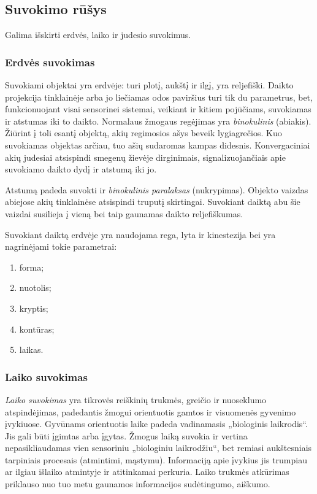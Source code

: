 \subsection{Suvokimo rūšys}

Galima išskirti erdvės, laiko ir judesio suvokimus.

\subsubsection{Erdvės suvokimas}

Suvokiami objektai yra erdvėje: turi plotį, aukštį ir ilgį, yra reljefiški.
Daikto projekcija tinklainėje arba jo liečiamas odos paviršius turi tik du 
parametrus, bet, funkcionuojant visai sensorinei sistemai, veikiant ir 
kitiem pojūčiams, suvokiamas ir atstumas iki to daikto. Normalaus žmogaus 
regėjimas yra \emph{binokulinis} (abiakis). Žiūrint į toli esantį objektą,
akių regimosios ašys beveik lygiagrečios. Kuo suvokiamas objektas arčiau, 
tuo ašių sudaromas kampas didesnis. Konvergaciniai akių judesiai atsispindi 
smegenų žievėje dirginimais, signalizuojančiais apie suvokiamo daikto dydį
ir atstumą iki jo.

Atstumą padeda suvokti ir \emph{binokulinis paralaksas} (nukrypimas). 
Objekto vaizdas abiejose akių tinklainėse atsispindi truputį skirtingai. 
Suvokiant daiktą abu šie vaizdai susilieja į vieną bei taip gaunamas
daikto reljefiškumas.

Suvokiant daiktą erdvėje yra naudojama rega, lyta ir \gls{kinestezija}
bei yra nagrinėjami tokie parametrai:
\begin{enumerate}
  \item forma;
  \item nuotolis;
  \item kryptis;
  \item kontūras;
  \item laikas.
\end{enumerate}

\subsubsection{Laiko suvokimas}

\emph{Laiko suvokimas} yra tikrovės reiškinių trukmės, greičio ir nuoseklumo
atspindėjimas, padedantis žmogui orientuotis gamtos ir visuomenės gyvenimo
įvykiuose. Gyvūnams orientuotis laike padeda vadinamasis „biologinis 
laikrodis“. Jis gali būti įgimtas arba įgytas. Žmogus laiką suvokia ir 
vertina nepasikliaudamas vien sensoriniu „biologiniu laikrodžiu“, bet
remiasi aukštesniais tarpiniais procesais (atmintimi, mąstymu). Informaciją
apie įvykius jis trumpiau ar ilgiau išlaiko atmintyje ir atitinkamai 
perkuria. Laiko trukmės atkūrimas priklauso nuo tuo metu gaunamos 
informacijos sudėtingumo, aiškumo. 

